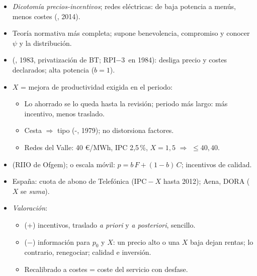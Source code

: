 \documentclass{article}
\begin{document}
\begin{columnas}
\begin{itemize}
\item \emph{Dicotomía precios-incentivos}; redes eléctricas: de baja potencia a menús, menos costes (, 2014).
\item Teoría normativa más completa; supone benevolencia, compromiso y conocer $\psi$ y la distribución.
\end{itemize}

\begin{itemize}
\item {} (, 1983, privatización de BT; RPI$-$3~en 1984): desliga precio y costes declarados; alta potencia ($b=1$).
\item $X$ = mejora de productividad exigida en el periodo:
  \begin{itemize}
  \item Lo ahorrado se lo queda hasta la revisión; periodo más largo: más incentivo, menos traslado.
  \item Cesta $\Rightarrow$ tipo  (-, 1979); no distorsiona factores.
  \item Redes del Valle: 40 €/MWh, IPC 2,5\,\%, $X=1{,}5$ $\Rightarrow$ $\leq40{,}40$.
  \end{itemize}
\end{itemize}
\begin{itemize}
\item {} (RIIO de Ofgem);  o escala móvil: $p=b\,F+(1-b)\,C$; incentivos de calidad.
\item España: cuota de abono de Telefónica ($\mathrm{IPC}-X$ hasta 2012); Aena, DORA ($X$ se \emph{suma}).
\item \emph{Valoración}:
  \begin{itemize}
  \item (+) incentivos, traslado \emph{a priori} y \emph{a posteriori}, sencillo.
  \item ($-$) información para $p_0$ y $X$: un precio alto o una $X$ baja dejan rentas; lo contrario, renegociar; calidad e inversión.
  \item Recalibrado a costes = coste del servicio con desfase.
  \end{itemize}
\end{itemize}


\end{columnas}
\end{document}

